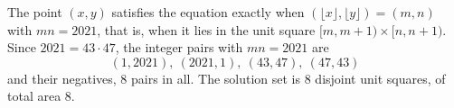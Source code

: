 The point $(x,y)$ satisfies the equation exactly when $(\lfloor x\rfloor,\lfloor y\rfloor)=(m,n)$ with $mn=2021$, that is, when it lies in the unit square $[m,m+1)\times[n,n+1)$. Since $2021=43\cdot47$, the integer pairs with $mn=2021$ are
\[(1,2021),\ (2021,1),\ (43,47),\ (47,43)\]
and their negatives, $8$ pairs in all. The solution set is $8$ disjoint unit squares, of total area $\boxed{8}$.
